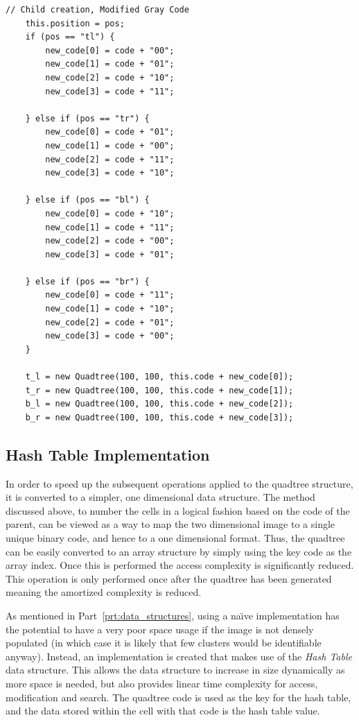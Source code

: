 \begin{lstlisting}[caption={Code to generate children of the current quadtree
while maintaining the correct ordering. Modified Gray code order. Since the
ordering is different for each quadrant, the ordering is changed depending on
the position of the current node.},
label=code:child_construction_mgc]
	// Child creation, Modified Gray Code
	this.position = pos;
	if (pos == "tl") {
		new_code[0] = code + "00";
		new_code[1] = code + "01";
		new_code[2] = code + "10";
		new_code[3] = code + "11";

	} else if (pos == "tr") {
		new_code[0] = code + "01";
		new_code[1] = code + "00";
		new_code[2] = code + "11";
		new_code[3] = code + "10";

	} else if (pos == "bl") {
		new_code[0] = code + "10";
		new_code[1] = code + "11";
		new_code[2] = code + "00";
		new_code[3] = code + "01";

	} else if (pos == "br") {
		new_code[0] = code + "11";
		new_code[1] = code + "10";
		new_code[2] = code + "01";
		new_code[3] = code + "00";
	}

	t_l = new Quadtree(100, 100, this.code + new_code[0]);
	t_r = new Quadtree(100, 100, this.code + new_code[1]);
	b_l = new Quadtree(100, 100, this.code + new_code[2]);
	b_r = new Quadtree(100, 100, this.code + new_code[3]);
\end{lstlisting}

\subsection{Hash Table Implementation}
\label{sub:hash_table_implementation}

In order to speed up the subsequent operations applied to the quadtree
structure, it is converted to a simpler, one dimensional data structure. The
method discussed above, to number the cells in a logical fashion based on the
code of the parent, can be viewed as a way to map the two dimensional image to
a single unique binary code, and hence to a one dimensional format. Thus, the
quadtree can be easily converted to an array structure by simply using the key
code as the array index. Once this is performed the access complexity is
significantly reduced. This operation is only performed once after the quadtree
has been generated meaning the amortized complexity is reduced.

As mentioned in Part~\ref{prt:data_structures}, using a na\"{\i}ve
implementation has the potential to have a very poor space usage if the image
is not densely populated (in which case it is likely that few clusters would be
identifiable anyway). Instead, an implementation is created that makes use of
the \emph{Hash Table} data structure\cite{cormen2001introduction}. This allows
the data structure to increase in size dynamically as more space is needed, but
also provides linear time complexity for access, modification and search. The
quadtree code is used as the key for the hash table, and the data stored within
the cell with that code is the hash table value.

